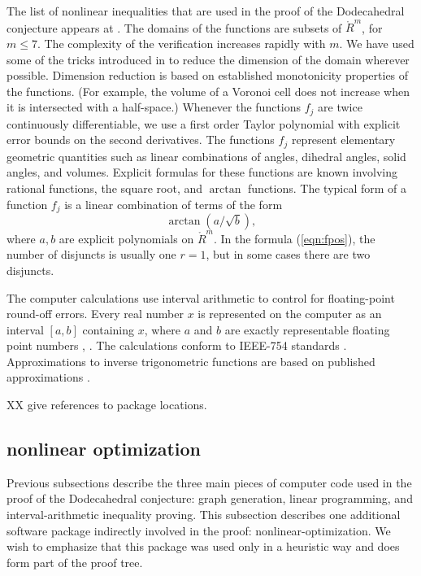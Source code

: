 The list of nonlinear inequalities that are used in the
proof of the Dodecahedral conjecture appears at \cite{XX}.
The domains of the functions are subsets of $\ring{R}^m$, for
$m\le 7$.  The complexity of the verification increases
rapidly with $m$.  We have used some of the tricks introduced
in \cite{DCG} to reduce the dimension of the domain wherever
possible.  Dimension reduction is based on established
monotonicity properties of the functions.  (For example, the
volume of a Voronoi cell does not increase when it is intersected
with a half-space.)  Whenever the functions $f_j$ are twice continuously
differentiable, we use a first order Taylor polynomial with
explicit error bounds on the second derivatives. 
The functions $f_j$ represent elementary geometric quantities such
as linear combinations of angles, dihedral angles, solid angles,
and volumes.  Explicit formulas for these functions are known
involving rational functions, the square root, and $\arctan$ functions.
The typical form of a function $f_j$ is a linear combination of terms
of the form
    $$
    \arctan(a/\sqrt{b}),
    $$
where $a,b$ are explicit polynomials on $\ring{R}^m$.
In the 
formula (\ref{eqn:fpos}), the number of disjuncts is usually one
$r=1$, but in some cases there are two disjuncts.

The computer calculations use interval arithmetic to
control for floating-point round-off errors.  Every real number $x$
is represented on the computer as an interval $[a,b]$ containing $x$, where $a$ and $b$ are
exactly representable floating point numbers \cite{Interval}, \cite{Numerics}.
The calculations conform to IEEE-754 standards \cite{Float}.
Approximations to inverse trigonometric functions are based on 
published approximations \cite{Approx}.

XX give references to package locations.




\subsection{nonlinear optimization}

Previous subsections describe the three main pieces of computer
code used in the proof of the Dodecahedral conjecture: graph 
generation, linear programming, and interval-arithmetic inequality
proving.  This subsection describes one additional software
package indirectly involved in the proof: nonlinear-optimization.  
We wish to emphasize that this package was used only in a heuristic way
and does form part of the proof tree.

